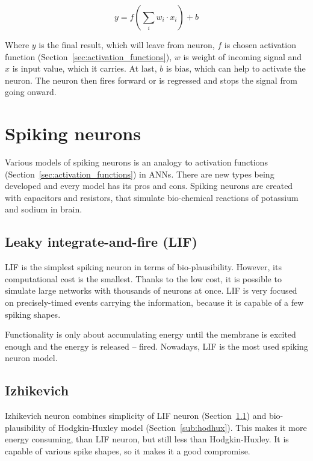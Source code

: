 $$
	y = f(\sum_i{w_i \cdot x_i}) + b
$$

Where $y$ is the final result, which will leave from neuron, $f$ is chosen activation function (Section~\ref{sec:activation_functions}), $w$ is weight of incoming signal and $x$ is input value, which it carries. At last, $b$ is bias, which can help to activate the neuron. The neuron then fires forward or is regressed and stops the signal from going onward.

%
%

\section{Spiking neurons}
\label{sec:snn_neurons}

Various models of spiking neurons is an analogy to activation functions (Section~\ref{sec:activation_functions}) in ANNs. There are new types being developed and every model has its pros and cons. Spiking neurons are created with capacitors and resistors, that simulate bio-chemical reactions of potassium and sodium in brain.


\subsection{Leaky integrate-and-fire (LIF)}%
\label{sub:lif}

LIF is the simplest spiking neuron in terms of bio-plausibility. However, its computational cost is the smallest. Thanks to the low cost, it is possible to simulate large networks with thousands of neurons at once. \cite{brainmodels-lif} LIF is very focused on precisely-timed events carrying the information,  because it is capable of a few spiking shapes. \cite{bisnn-for-decoding-muscle-act}

Functionality is only about accumulating energy until the membrane is excited enough and the energy is released -- fired. Nowadays, LIF is the most used spiking neuron model.


\subsection{Izhikevich}%
\label{sub:izhi}

Izhikevich neuron combines simplicity of LIF neuron (Section~\ref{sub:lif}) and bio-plausibility of Hodgkin-Huxley model (Section~\ref{sub:hodhux}). This makes it more energy consuming, than LIF neuron, but still less than Hodgkin-Huxley. It is capable of various spike shapes, so it makes it a good compromise. \cite{brainmodels-izhi}

